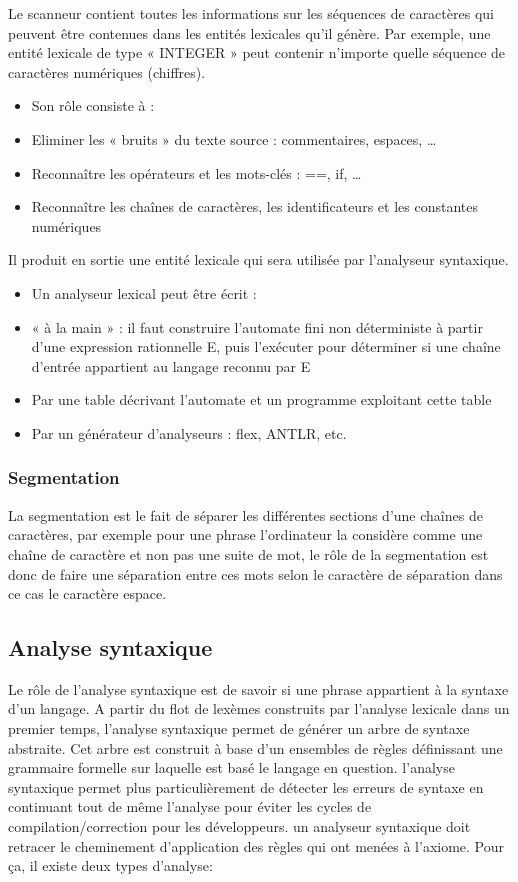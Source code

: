 \documentclass{article}
\begin{document}
Le scanneur contient toutes les informations sur les séquences de caractères qui peuvent être contenues dans les entités lexicales qu'il génère. Par exemple, une entité lexicale de type « INTEGER » peut contenir n'importe quelle séquence de caractères numériques (chiffres).
\begin{itemize}
\item Son rôle consiste à :
			\item Eliminer les « bruits » du texte source : commentaires, espaces, …
			\item Reconnaître les opérateurs et les mots-clés : ==, if, …
			\item Reconnaître les chaînes de caractères, les identificateurs et les constantes numériques
\end{itemize}
Il produit en sortie une entité lexicale qui sera utilisée par l'analyseur syntaxique.
\begin{itemize}
\item Un analyseur lexical peut être écrit :
			\item « à la main » : il faut construire l'automate fini non déterministe à partir d'une expression rationnelle E, puis l'exécuter pour déterminer si une chaîne d'entrée appartient au langage reconnu par E
			\item Par une table décrivant l'automate et un programme exploitant cette table
			\item Par un générateur d'analyseurs : flex, ANTLR, etc.
\end{itemize}    

\subsubsection{Segmentation}
La segmentation est le fait de séparer les différentes sections d’une chaînes de caractères, par exemple pour une phrase l’ordinateur la considère comme une chaîne de caractère et non pas une suite de mot, le rôle de la segmentation est donc de faire une séparation entre ces mots selon le caractère de séparation dans ce cas le caractère espace.

\subsection{Analyse syntaxique}
Le rôle de l’analyse syntaxique \cite{refAnalyseSyntaxique} est de savoir si une phrase appartient à la syntaxe d’un langage.
A partir du flot de lexèmes construits par l’analyse lexicale dans un premier temps, l’analyse syntaxique permet de générer un arbre de syntaxe abstraite.
Cet arbre est construit à base d’un ensembles de règles définissant une grammaire formelle sur laquelle est basé le langage en question.
l’analyse syntaxique permet plus particulièrement de détecter les erreurs de syntaxe en continuant tout de même l’analyse pour éviter les cycles de compilation/correction pour les développeurs.
un analyseur syntaxique doit retracer le cheminement d’application des règles qui ont menées à l’axiome. Pour ça, il existe deux types d’analyse:
\end{document}
